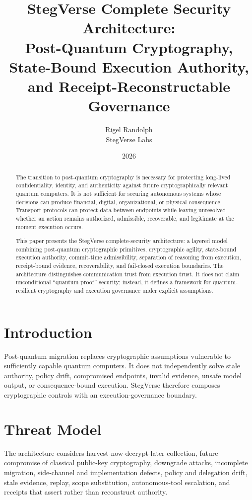 \documentclass[11pt]{article}
\title{StegVerse Complete Security Architecture:\\Post-Quantum Cryptography, State-Bound Execution Authority, and Receipt-Reconstructable Governance}
\author{Rigel Randolph\\StegVerse Labs}
\date{2026}
\begin{document}
\maketitle

\begin{abstract}
The transition to post-quantum cryptography is necessary for protecting long-lived confidentiality, identity, and authenticity against future cryptographically relevant quantum computers. It is not sufficient for securing autonomous systems whose decisions can produce financial, digital, organizational, or physical consequence. Transport protocols can protect data between endpoints while leaving unresolved whether an action remains authorized, admissible, recoverable, and legitimate at the moment execution occurs.

This paper presents the StegVerse complete-security architecture: a layered model combining post-quantum cryptographic primitives, cryptographic agility, state-bound execution authority, commit-time admissibility, separation of reasoning from execution, receipt-bound evidence, recoverability, and fail-closed execution boundaries. The architecture distinguishes communication trust from execution trust. It does not claim unconditional ``quantum proof'' security; instead, it defines a framework for quantum-resilient cryptography and execution governance under explicit assumptions.
\end{abstract}

\section{Introduction}
Post-quantum migration replaces cryptographic assumptions vulnerable to sufficiently capable quantum computers. It does not independently solve stale authority, policy drift, compromised endpoints, invalid evidence, unsafe model output, or consequence-bound execution. StegVerse therefore composes cryptographic controls with an execution-governance boundary.

\begin{center}
\end{center}

\section{Threat Model}
The architecture considers harvest-now-decrypt-later collection, future compromise of classical public-key cryptography, downgrade attacks, incomplete migration, side-channel and implementation defects, policy and delegation drift, stale evidence, replay, scope substitution, autonomous-tool escalation, and receipts that assert rather than reconstruct authority.
\end{document}
